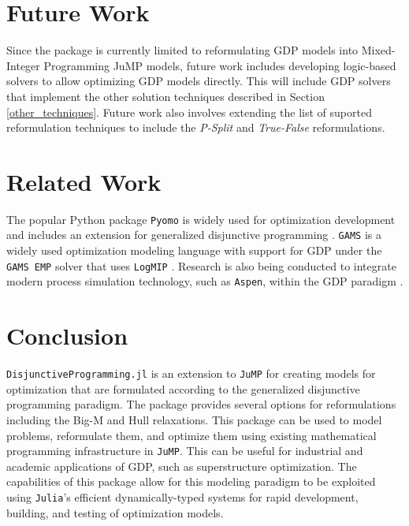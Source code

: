 \documentclass{juliacon}
\begin{document}
\section{Future Work}
Since the package is currently limited to reformulating GDP models into Mixed-Integer Programming JuMP models, future work includes developing logic-based solvers to allow optimizing GDP models directly. This will include GDP solvers that implement the other solution techniques described in Section \ref{other_techniques}. Future work also involves extending the list of suported reformulation techniques to include the \textit{P-Split} \cite{kronqvist2022p} and \textit{True-False} \cite{agarwal2015novel} reformulations.

\section{Related Work}
The popular Python package \verb|Pyomo| \cite{bynum2021pyomo, hart2011pyomo} is widely used for optimization development and includes an extension for generalized disjunctive programming \cite{chen2022pyomo}. \verb|GAMS| \cite{Bussieck2004} is a widely used optimization modeling language with support for GDP under the \verb|GAMS EMP| solver that uses \verb|LogMIP| \cite{vecchietti1999logmip}. Research is also being conducted to integrate modern process simulation technology, such as \verb|Aspen|, within the GDP paradigm \cite{NAVARROAMOROS201413}.

\section{Conclusion}
\verb|DisjunctiveProgramming.jl| is an extension to \verb|JuMP| for creating models for optimization that are formulated according to the generalized disjunctive programming paradigm. The package provides several options for reformulations including the Big-M and Hull relaxations. This package can be used to model problems, reformulate them, and optimize them using existing mathematical programming infrastructure in \verb|JuMP|. This can be useful for industrial and academic applications of GDP, such as superstructure optimization. The capabilities of this package allow for this modeling paradigm to be exploited using \verb|Julia|'s efficient dynamically-typed systems for rapid development, building, and testing of optimization models.


\end{document}
